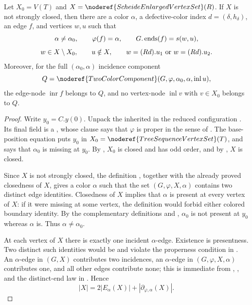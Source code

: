 \begin{helper}
Let $X_0=V(T)$ and $X=\noderef{ScheideEnlargedVertexSet}(R)$.  If $X$ is
not strongly closed, then there are a color $\alpha$, a defective-color
index $d=(\delta,h_\delta)$, an edge $f$, and vertices $w,u$ such that
\[
 \alpha\ne\alpha_0,\qquad \varphi(f)=\alpha,\qquad
 G.\mathop{\rm ends}(f)=s(w,u),
\]
\[
 w\in X\setminus X_0,\qquad u\notin X,\qquad
 w=(R d).u_1\ \hbox{or}\ w=(R d).u_2.
\]
Moreover, for the full $(\alpha_0,\alpha)$ incidence component
\[
 Q=\noderef{TwoColorComponent}(G,\varphi,\alpha_0,\alpha,
      \operatorname{inl}u),
\]
the edge-node $\operatorname{inr}f$ belongs to $Q$, and no vertex-node
$\operatorname{inl}v$ with $v\in X_0$ belongs to $Q$.
\end{helper}
\begin{proof}
Write $y_0=C.y(0)$.  Unpack the inherited
 in the reduced configuration
.  Its final field is a
, whose  clause says that
$\varphi$ is proper in the sense of .  The
base-position equation puts $y_0$ in
$X_0=\noderef{TreeSequenceVertexSet}(T)$, and
 says that $\alpha_0$ is missing at
$y_0$.  By , $X_0$ is closed and has
odd order, and by , $X$ is closed.

Since $X$ is not strongly closed, the definition
, together with the already proved
closedness of $X$, gives a color $\alpha$ such that the set
$(G,\varphi,X,\alpha)$ contains two distinct
edge identities.  Closedness of $X$ implies that $\alpha$ is present at
every vertex of $X$: if it were missing at some vertex, the definition
 would forbid either colored boundary
identity.  By the complementary definitions  and
, $\alpha_0$ is not present at $y_0$ whereas
$\alpha$ is.  Thus $\alpha\ne\alpha_0$.

At each vertex of $X$ there is exactly one incident $\alpha$-edge.
Existence is presentness.  Two distinct such identities would be
 and violate the properness condition in
.  An $\alpha$-edge in
$(G,X)$ contributes two incidences, an
$\alpha$-edge in
$(G,\varphi,X,\alpha)$ contributes one, and
all other edges contribute none; this is immediate from
, , and the distinct-end law in
.  Hence
\[
 |X|=2|E_\alpha(X)|+|\partial_{\varphi,\alpha}(X)|.       \tag{1}
\]


\end{proof}
